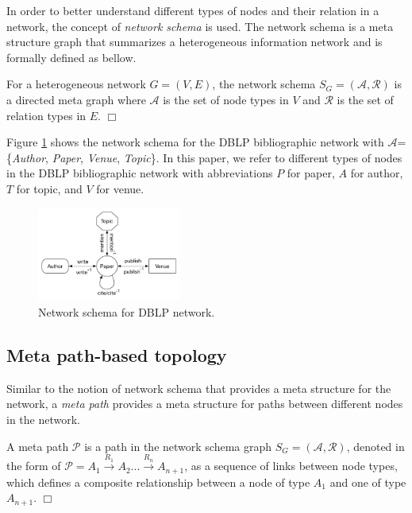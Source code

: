In order to better understand different types of nodes and their relation in a network, the concept of \textit{network schema} \cite{sun2011pathsim} is used. The network schema is a meta structure graph that summarizes a heterogeneous information network and is formally defined as bellow.

\begin{definition}
For a heterogeneous network $G=(V,E)$, the network schema $S_G=\mathcal{(A,R)}$ is a directed meta graph where $\mathcal{A}$ is the set of node types in $V$ and $\mathcal{R}$ is the set of relation types in $E$.  $\Box$
\end{definition}

Figure \ref{schema} shows the network schema for the DBLP bibliographic network with $\mathcal{A}$=\{\textit{Author}, \textit{Paper}, \textit{Venue}, \textit{Topic}\}. %
In this paper, we refer to different types of nodes in the DBLP bibliographic network with abbreviations $P$ for paper, $A$ for author, $T$ for topic, and $V$ for venue. 

\begin{figure}[t]
  \centering
      \includegraphics[trim = 0mm 10mm 0mm 0mm,width=0.42\textwidth]{figs/schema.pdf}
  \caption{Network schema for DBLP network.}\label{schema}
\end{figure}

\subsection{Meta path-based topology}

Similar to the notion of network schema that provides a meta structure for the network, a \textit{meta path} provides a meta structure for paths between different nodes in the network. 

\begin{definition}
A meta path $\mathcal{P}$ is a path in the network schema graph $S_G = (\mathcal{A,R})$, denoted in the form of $\mathcal{P} = A_1 \xrightarrow{R_1} A_2... \xrightarrow{R_n} A_{n+1}$, as a sequence of links between node types, which defines a composite relationship between a node of type $A_1$ and one of type $A_{n+1}$. $\Box$
\end{definition}



